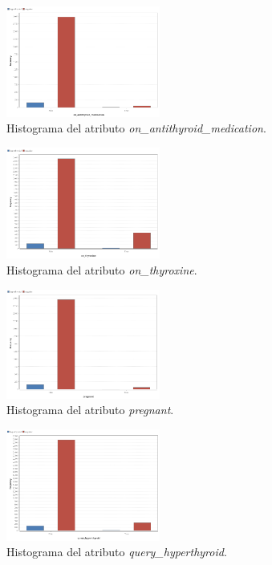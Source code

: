 \documentclass[osajnl,twocolumn,showpacs,superscriptaddress,10pt,floatfix]{revtex4-1} %
\begin{document}
\begin{figure}[H]
    \centering
    \includegraphics[width=0.45\textwidth]{analysis/histogram_on_antithyroid_medication}
    \caption{Histograma del atributo \textit{on\_antithyroid\_medication}.}
    \label{figure:on_antithyroid_medication}
\end{figure}

\begin{figure}[H]
    \centering
    \includegraphics[width=0.45\textwidth]{analysis/histogram_on_thyroxine}
    \caption{Histograma del atributo \textit{on\_thyroxine}.}
    \label{figure:on_thyroxine}
\end{figure}

\begin{figure}[H]
    \centering
    \includegraphics[width=0.45\textwidth]{analysis/histogram_pregnant}
    \caption{Histograma del atributo \textit{pregnant}.}
    \label{figure:pregnant}
\end{figure}

\begin{figure}[H]
    \centering
    \includegraphics[width=0.45\textwidth]{analysis/histogram_query_hyperthyroid}
    \caption{Histograma del atributo \textit{query\_hyperthyroid}.}
    \label{figure:query_hyperthyroid}
\end{figure}
\end{document}

